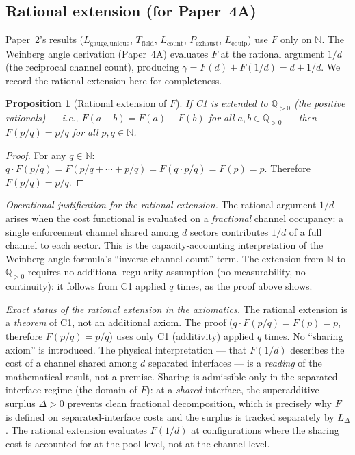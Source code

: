 \documentclass[11pt,a4paper]{article}
\newtheorem{proposition}[theorem]{Proposition}
\theoremstyle{definition}
\begin{document}
\subsection{Rational extension (for Paper~4A)}
\label{sec:cauchy_rational}

Paper~2's results ($L_{\mathrm{gauge,unique}}$, $T_{\mathrm{field}}$,
$L_{\mathrm{count}}$, $P_{\mathrm{exhaust}}$, $L_{\mathrm{equip}}$) use
$F$ only on $\mathbb{N}$.  The Weinberg angle derivation (Paper~4A)
evaluates $F$ at the rational argument $1/d$ (the reciprocal channel
count), producing $\gamma = F(d) + F(1/d) = d + 1/d$.  We record the
rational extension here for completeness.

\begin{proposition}[Rational extension of $F$]\label{prop:rational_ext}
If C1 is extended to $\mathbb{Q}_{>0}$ (the positive rationals) ---
i.e., $F(a+b) = F(a) + F(b)$ for all $a, b \in \mathbb{Q}_{>0}$ ---
then $F(p/q) = p/q$ for all $p, q \in \mathbb{N}$.
\end{proposition}

\begin{proof}
For any $q \in \mathbb{N}$: $q \cdot F(p/q) = F(p/q + \cdots + p/q)
= F(q \cdot p/q) = F(p) = p$.  Therefore $F(p/q) = p/q$.
\end{proof}

\noindent\textit{Operational justification for the rational extension.}\quad
The rational argument $1/d$ arises when the cost functional is evaluated
on a \emph{fractional} channel occupancy: a single enforcement channel
shared among $d$ sectors contributes $1/d$ of a full channel to each
sector.  This is the capacity-accounting interpretation of the Weinberg
angle formula's ``inverse channel count'' term.  The extension from
$\mathbb{N}$ to $\mathbb{Q}_{>0}$ requires no additional regularity
assumption (no measurability, no continuity): it follows from C1 applied
$q$ times, as the proof above shows.

\smallskip\noindent\textit{Exact status of the rational extension in the axiomatics.}\quad
The rational extension is a \emph{theorem} of C1, not an additional
axiom.  The proof ($q \cdot F(p/q) = F(p) = p$, therefore
$F(p/q) = p/q$) uses only C1 (additivity) applied $q$ times.  No
``sharing axiom'' is introduced.  The physical interpretation ---
that $F(1/d)$ describes the cost of a channel shared among $d$
separated interfaces --- is a \emph{reading} of the mathematical
result, not a premise.  Sharing is admissible only in the
separated-interface regime (the domain of $F$): at a \emph{shared}
interface, the superadditive surplus $\Delta > 0$ prevents clean
fractional decomposition, which is precisely why $F$ is defined on
separated-interface costs and the surplus is tracked separately by
$L_\Delta$.  The rational extension evaluates $F(1/d)$ at
configurations where the sharing cost is accounted for at the pool
level, not at the channel level.
\end{document}
